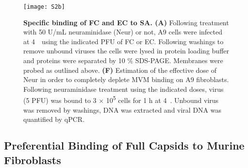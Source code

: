 \vspace{1.5cm}

\begin{figure}[H]
\begin{minipage}{\textwidth}
\centering
\texttt{[image: S2b]} \\[0.3cm]
\caption[Specific Binding of Full Capsids and Empty Capsids to Sialic Acid]{\textbf{Specific binding of FC and EC to SA. (A)} Following treatment with 50 U/mL neuraminidase (Neur) or not, A9 cells were infected at \mbox{4 \textcelsius}~using the indicated PFU of FC or EC\footnotemark. Following washings to remove unbound viruses the cells were lysed in protein loading buffer and proteins were separated by 10 \% SDS-PAGE. Membranes were probed as outlined above. \textbf{(F)} Estimation of the effective dose of Neur in order to completely deplete MVM binding on A9 fibroblasts. Following neuraminidase treatment using the indicated doses, virus (5 PFU) was bound to 3 $\times$ 10\textsuperscript{5} cells for 1 h at \mbox{4 \textcelsius}. Unbound virus was removed by washings, DNA was extracted and viral DNA was quantified by qPCR.}

\label{S2b}
\vspace{1cm}

\end{minipage}

\end{figure}



\subsection{Preferential Binding of Full Capsids to Murine Fibroblasts}

